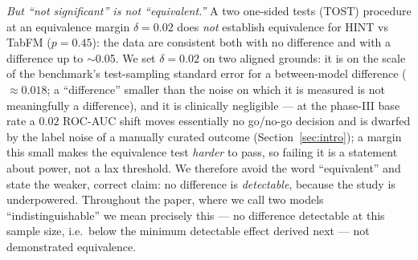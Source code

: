 \documentclass[a4paper,fleqn]{cas-sc}
\begin{document}
\emph{But ``not significant'' is not ``equivalent.''} A two one-sided tests (TOST) procedure at
an equivalence margin $\delta=0.02$ does \emph{not} establish
equivalence for HINT vs TabFM ($p=0.45$): the data are consistent both with no difference and
with a difference up to $\sim$0.05. We set $\delta=0.02$ on two aligned grounds: it is on the scale
of the benchmark's test-sampling standard error for a between-model difference ($\approx0.018$; a
``difference'' smaller than the noise on which it is measured is not meaningfully a difference), and
it is clinically negligible --- at the phase-III base rate a $0.02$ ROC-AUC shift moves essentially
no go/no-go decision and is dwarfed by the label noise of a manually curated outcome
(Section~\ref{sec:intro}); a margin this small makes the equivalence test \emph{harder} to pass, so
failing it is a statement about power, not a lax threshold. We therefore avoid the word ``equivalent'' and state the
weaker, correct claim: no difference is \emph{detectable}, because the study is underpowered.
Throughout the paper, where we call two models ``indistinguishable'' we mean precisely this ---
no difference detectable at this sample size, i.e.\ below the minimum detectable effect derived
next --- not demonstrated equivalence.
\end{document}
